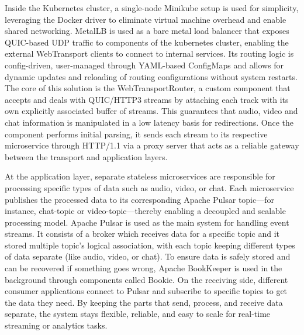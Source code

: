 Inside the Kubernetes cluster, a single-node Minikube setup is used for simplicity, leveraging the Docker driver to eliminate virtual machine overhead and enable shared networking. MetalLB is used as a bare metal load balancer that exposes QUIC-based UDP traffic to components of the kubernetes cluster, enabling the external WebTransport clients to connect to internal services. Its routing logic is config-driven, user-managed through YAML-based ConfigMaps and allows for dynamic updates and reloading of routing configurations without system restarts. The core of this solution is the WebTransportRouter, a custom component that accepts and deals with QUIC/HTTP3 streams by attaching each track with its own explicitly associated buffer of streams. This guarantees that audio, video and chat information is manipulated in a low latency basis for redirections. Once the component performs initial parsing, it sends each stream to its respective microservice through HTTP/1.1 via a proxy server that acts as a reliable gateway between the transport and application layers.

At the application layer, separate stateless microservices are responsible for processing specific types of data such as audio, video, or chat. Each microservice publishes the processed data to its corresponding Apache Pulsar topic—for instance, chat-topic or video-topic—thereby enabling a decoupled and scalable processing model. Apache Pulsar is used as the main system for handling event streams. It consists of a broker which receives data for a specific topic and it stored multiple topic's logical association, with each topic keeping different types of data separate (like audio, video, or chat). To ensure data is safely stored and can be recovered if something goes wrong, Apache BookKeeper is used in the background through components called Bookie. On the receiving side, different consumer applications connect to Pulsar and subscribe to specific topics to get the data they need. By keeping the parts that send, process, and receive data separate, the system stays flexible, reliable, and easy to scale for real-time streaming or analytics tasks.



